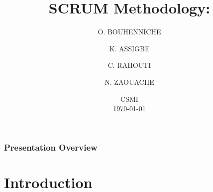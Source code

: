 \documentclass[
	11pt, %
]{beamer}
\title[Scrum Methodology]{ \textbf{SCRUM Methodology:} \\ \text{Team\_SCRUM}} %
\author[BOUHENNICHE \and ASSIGBE  \and RAHOUTI \and ZAOUACHE ]{O. BOUHENNICHE \and K. ASSIGBE \and C. RAHOUTI \and N. ZAOUACHE} %
\institute[]{University of Strasbourg } %
\date[\today]{ CSMI \\ \today} %
\begin{document}

\begin{frame}
	\titlepage %
\end{frame}



\begin{frame}
	\frametitle{Presentation Overview} %

	\tableofcontents %
\end{frame}


\section{Introduction} %
\end{document}
